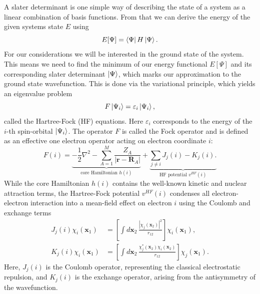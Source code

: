 A slater determinant is one simple way of describing the state of a system as a linear combination of basis functions. From that we can derive the energy of the given systems state $E$ using
\begin{equation}
    \label{eq:elec_energy}
    E[\Psi] = \bra{\Psi} H \ket{\Psi}.
\end{equation}
For our considerations we will be interested in the ground state of the system. This means we need to find the minimum of our energy functional $E[\Psi]$ and its corresponding slater determinant $\ket{\Psi}$, which marks our approximation to the ground state wavefunction. This is done via the variational principle, which yields an eigenvalue problem
\begin{equation}
    \label{eq:hf_eigenval_equation}
    F \ket{\Psi_i} = \varepsilon_i \ket{\Psi_i},
\end{equation}
called the Hartree-Fock (HF) equations. Here $\varepsilon_i$ corresponds to the energy of the $i$-th spin-orbital $\ket{\Psi_i}$. The operator $F$ is called the Fock operator and is defined as an effective one electron operator acting on electron coordinate $i$:
\begin{equation}
    F(i) = 
    \underbrace{
        -\frac{1}{2} \nabla^2 
        - \sum_{A=1}^M \frac{Z_A}{|\mathbf{r} - \mathbf{R}_A|}
    }_{\text{core Hamiltonian } h(i)}
    + 
    \underbrace{
        \sum_{j\neq i} J_j(i) - K_j(i).
    }_{\text{HF potential }v^{HF}(i)}
\end{equation}
While the core Hamiltonian $h(i)$ contains the well-known kinetic and nuclear attraction terms, the Hartree-Fock potential $v^{HF}(i)$ condenses all electron-electron interaction into a mean-field effect on electron $i$ using the Coulomb and exchange terms
\begin{subequations}
\begin{align}
    J_j(i)\chi_i(\mathbf{x}_1) &= \left[ \int d\mathbf{x}_2\, \frac{|\chi_j(\mathbf{x}_2)|^2}{r_{12}} \right] \chi_i(\mathbf{x}_1),\\
    K_j(i)\chi_i(\mathbf{x}_1) &= \left[ \int d\mathbf{x}_2\, \frac{\chi_j^*(\mathbf{x}_2)\chi_i(\mathbf{x}_2)}{r_{12}} \right] \chi_j(\mathbf{x}_1).
\end{align}
\end{subequations}
Here, $J_j(i)$ is the Coulomb operator, representing the classical electrostatic repulsion, and $K_j(i)$ is the exchange operator, arising from the antisymmetry of the wavefunction.

